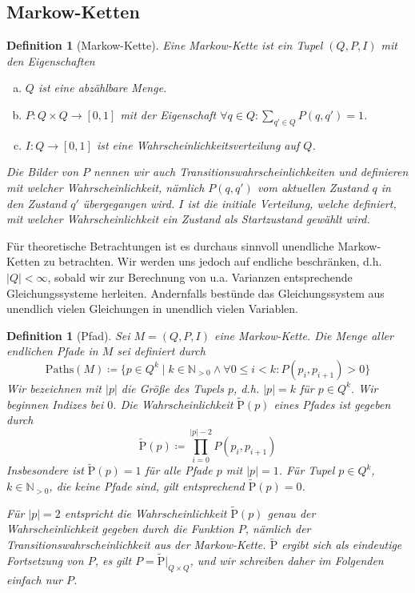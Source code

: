 \documentclass[a4paper]{article}
\newcommand{\mc}{Markow-Kette}
\newtheorem{definition}[satz]{Definition} %
\theoremstyle{nonumberplain}
\begin{document}
\subsection{\mc{}n}

\newcommand{\mcex}{$M = (Q, P, I)$}
\begin{definition}[\mc]\label{def-mc}
	Eine \mc{} ist ein Tupel $(Q, P, I)$ mit den Eigenschaften
	\begin{enumerate}[(a)]
		\item $Q$ ist eine abzählbare Menge.
		\item $P : Q \times Q \to [0,1]$ mit der Eigenschaft $\forall q \in Q : \sum_{q' \in Q}{P(q,q') = 1}$.
		\item $I : Q \to [0,1]$ ist eine Wahrscheinlichkeitsverteilung auf $Q$.
	\end{enumerate}	
	Die Bilder von $P$ nennen wir auch Transitionswahrscheinlichkeiten und definieren mit welcher Wahrscheinlichkeit, nämlich $P(q,q')$ vom aktuellen Zustand $q$ in den Zustand $q'$ übergegangen wird. $I$ ist die initiale Verteilung, welche definiert, mit welcher Wahrscheinlichkeit ein Zustand als Startzustand gewählt wird.
\end{definition}

Für theoretische Betrachtungen ist es durchaus sinnvoll unendliche \mc{}n zu betrachten. Wir werden uns jedoch auf endliche beschränken, d.h. $|Q| < \infty$, sobald wir zur Berechnung von u.a. Varianzen entsprechende Gleichungssysteme herleiten. Andernfalls bestünde das Gleichungssystem aus unendlich vielen Gleichungen in unendlich vielen Variablen.

\newcommand{\gpath}{Pfad}
\newcommand{\pfin}{\mathrm{Paths}}%
\begin{definition}[\gpath]\label{def-path}
	Sei \mcex{} eine \mc{}. Die Menge aller endlichen \gpath e in $M$ sei definiert durch
	\begin{equation}
		\pfin(M) \coloneqq \{p \in Q^{k} \mid k \in \mathbb{N}_{>0} \land \forall 0 \leq i < k : P(p_i,p_{i+1}) > 0\}
	\end{equation}
	Wir bezeichnen mit $|p|$ die Größe des Tupels $p$, d.h. $|p| = k$ für $p \in Q^k$. Wir beginnen Indizes bei $0$.
	Die Wahrscheinlichkeit $\mathrm{\tilde{P}}(p)$ eines Pfades ist gegeben durch
	\begin{equation}
		\mathrm{\tilde{P}}(p) \coloneqq \prod_{i = 0}^{|p| - 2}{P(p_i,p_{i+1})}
	\end{equation}
	Insbesondere ist $\mathrm{\tilde{P}}(p) = 1$ für alle Pfade $p$ mit $|p| = 1$. Für Tupel $p \in Q^k$, $k \in \mathbb{N}_{>0}$, die keine Pfade sind, gilt entsprechend $\mathrm{\tilde{P}}(p) = 0$.
	
	Für $|p| = 2$ entspricht die Wahrscheinlichkeit $\mathrm{\tilde{P}}(p)$ genau der Wahrscheinlichkeit gegeben durch die Funktion $P$, nämlich der Transitionswahrscheinlichkeit aus der \mc{}. $\mathrm{\tilde{P}}$ ergibt sich als eindeutige Fortsetzung von $P$, es gilt $P = \mathrm{\tilde{P}}\vert_{Q\times Q}$, und wir schreiben daher im Folgenden einfach nur $P$.
\end{definition}
\end{document}
